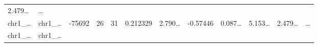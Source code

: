 \documentclass[
]{article}
\begin{document}
\begin{longtable}[]{@{}llllllllllll@{}}
\begin{minipage}[t]{0.06\columnwidth}
2.479\ldots{}\strut
\end{minipage} & \begin{minipage}[t]{0.02\columnwidth}\raggedright
\ldots{}\strut
\end{minipage}\tabularnewline
\begin{minipage}[t]{0.06\columnwidth}\raggedright
chr1\_\ldots{}\strut
\end{minipage} & \begin{minipage}[t]{0.06\columnwidth}\raggedright
chr1\_\ldots{}\strut
\end{minipage} & \begin{minipage}[t]{0.06\columnwidth}\raggedright
-75692\strut
\end{minipage} & \begin{minipage}[t]{0.06\columnwidth}\raggedright
26\strut
\end{minipage} & \begin{minipage}[t]{0.06\columnwidth}\raggedright
31\strut
\end{minipage} & \begin{minipage}[t]{0.06\columnwidth}\raggedright
0.212329\strut
\end{minipage} & \begin{minipage}[t]{0.08\columnwidth}\raggedright
2.790\ldots{}\strut
\end{minipage} & \begin{minipage}[t]{0.06\columnwidth}\raggedright
-0.57446\strut
\end{minipage} & \begin{minipage}[t]{0.06\columnwidth}\raggedright
0.087\ldots{}\strut
\end{minipage} & \begin{minipage}[t]{0.09\columnwidth}\raggedright
5.153\ldots{}\strut
\end{minipage} & \begin{minipage}[t]{0.06\columnwidth}\raggedright
2.479\ldots{}\strut
\end{minipage} & \begin{minipage}[t]{0.02\columnwidth}\raggedright
\ldots{}\strut
\end{minipage}\tabularnewline
\begin{minipage}[t]{0.06\columnwidth}\raggedright
chr1\_\ldots{}\strut
\end{minipage} & \begin{minipage}[t]{0.06\columnwidth}\raggedright
chr1\_\ldots{}\strut
\end{minipage} & \begin{minipage}[t]{0.06\columnwidth}\raggedright

\end{minipage}
\end{longtable}
\end{document}
